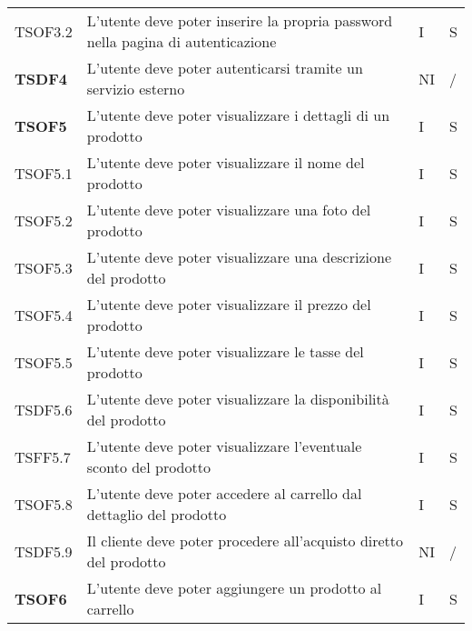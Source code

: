 \begin{center}
\begin{longtable}[!h]{p{60px} p{240px} p{35px} p{35px}}
        TSOF3.2         & L'utente deve poter inserire la propria password nella pagina di autenticazione                     & I              & S              \\
        \textbf{TSDF4}  & L'utente deve poter autenticarsi tramite un servizio esterno                                        & NI             & /              \\
        \textbf{TSOF5}  & L'utente deve poter visualizzare i dettagli di un prodotto                                          & I              & S              \\
        TSOF5.1         & L'utente deve poter visualizzare il nome del prodotto                                               & I              & S              \\
        TSOF5.2         & L'utente deve poter visualizzare una foto del prodotto                                              & I              & S              \\
        TSOF5.3         & L'utente deve poter visualizzare una descrizione del prodotto                                       & I              & S              \\
        TSOF5.4         & L'utente deve poter visualizzare il prezzo del prodotto                                             & I              & S              \\
        TSOF5.5         & L'utente deve poter visualizzare le tasse del prodotto                                              & I              & S              \\
        TSDF5.6         & L'utente deve poter visualizzare la disponibilità del prodotto                                      & I              & S              \\
        TSFF5.7         & L'utente deve poter visualizzare l'eventuale sconto del prodotto                                    & I              & S              \\
        TSOF5.8         & L'utente deve poter accedere al carrello dal dettaglio del prodotto                                 & I              & S              \\
        TSDF5.9         & Il cliente deve poter procedere all'acquisto diretto del prodotto                                   & NI             & /              \\
        \textbf{TSOF6}  & L'utente deve poter aggiungere un prodotto al carrello                                              & I              & S              \\

\end{longtable}
\end{center}
